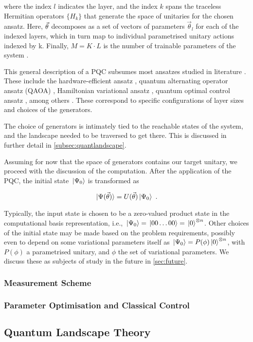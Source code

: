 where the index \(l\) indicates the layer, and the index \(k\) spans the
traceless Hermitian operators \(\{H_k\}\) that generate the space of unitaries
for the chosen ansatz. Here, \(\vec{\theta}\) decomposes as a set of vectors of
parameters \(\vec{\theta}_l\) for each of the indexed layers, which in turn map
to individual parametrised unitary actions indexed by k. Finally, \(M = K \cdot
L\) is the number of trainable parameters of the system \cite[see][section
II.A]{larocca2021theory}.

This general description of a PQC subsumes most ansatzes studied in literature
\cite{larocca2021diagnosing}. These include the hardware-efficient ansatz
\cite{kandala2017hardware}, quantum alternating operator ansatz (QAOA)
\cite{farhi2014quantum}, Hamiltonian variational ansatz
\cite{wecker2015progress}, quantum optimal control ansatz
\cite{choquette2021quantum}, among others \cite{hadfield2019quantum,
zhu2020adaptive, lee2021progress}. These correspond to specific configurations
of layer sizes and choices of the generators.

The choice of generators is intimately tied to the reachable states of the
system, and the landscape needed to be traversed to get there. This is discussed
in further detail in \autoref{subsec:quantlandscape}.

Assuming for now that the space of generators contains our target unitary, we
proceed with the discussion of the computation. After the application of the
PQC, the initial state \(\ket*{\Psi_0}\) is transformed as

\begin{gather}
    \ket*{\Psi(\vec{\theta})} = U(\vec{\theta})\ket*{\Psi_0}~.
\end{gather}

Typically, the input state is chosen to be a zero-valued product state in the
computational basis representation, i.e., \(\ket*{\Psi_0} = \ket*{00\ldots 00} =
\ket*{0}^{\otimes n}\). Other choices of the initial state may be made based on
the problem requirements, possibly even to depend on some variational parameters
itself as \(\ket*{\Psi_0} = P(\phi) \ket*{0}^{\otimes n}\), with \(P(\phi)\) a
parametrised unitary, and \(\phi\) the set of variational parameters. We discuss
these as subjects of study in the future in \autoref{sec:future}.

\subsubsection{Measurement Scheme}

\subsubsection{Parameter Optimisation and Classical Control}

\subsection{Quantum Landscape Theory}
\label{subsec:quantlandscape}